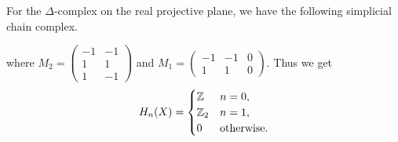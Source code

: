 \begin{example}
   For the $\Delta$-complex on the real projective plane, we have the following simplicial chain complex.
  \begin{center}
  \end{center}
  where
  $
    M_2 =
    \begin{pmatrix}
      -1 & -1 \\ 1 & 1 \\ 1 & -1
    \end{pmatrix}
  $
  and
  $
    M_1 =
    \begin{pmatrix}
      -1 & -1 & 0 \\
      1  & 1  & 0
    \end{pmatrix}
  $.
  Thus we get
  \[
    H_n(X) =
    \begin{cases}
      \mathbb{Z}   & n = 0,            \\
      \mathbb{Z}_2 & n = 1,            \\
      0    & \text{otherwise}.
    \end{cases}
  \]
\end{example}

